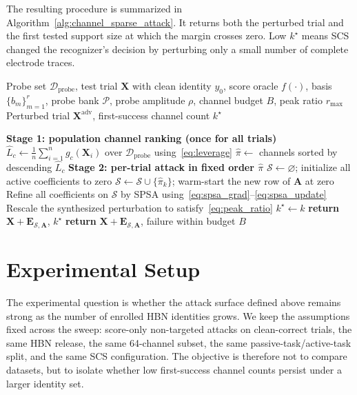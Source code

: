 \documentclass[journal]{IEEEtran}
\begin{document}
The resulting procedure is summarized in Algorithm~\ref{alg:channel_sparse_attack}. It returns both the perturbed trial and the first tested support size at which the margin crosses zero. Low $k^\star$ means SCS changed the recognizer's decision by perturbing only a small number of complete electrode traces.

\begin{algorithm}[t]
\caption{Sparse-Channel Search (SCS)}
\label{alg:channel_sparse_attack}
\begin{algorithmic}[1]
\REQUIRE Probe set $\mathcal{D}_{\mathrm{probe}}$, test trial $\mathbf{X}$ with clean identity $y_0$, score oracle $f(\cdot)$, basis $\{b_m\}_{m=1}^{r}$, probe bank $\mathcal{P}$, probe amplitude $\rho$, channel budget $B$, peak ratio $r_{\max}$
\ENSURE Perturbed trial $\mathbf{X}^{\mathrm{adv}}$, first-success channel count $k^\star$

\STATE \textbf{Stage 1: population channel ranking (once for all trials)}
    \STATE $\widehat{L}_c\leftarrow\frac{1}{n}\sum_{i=1}^{n} g_c(\mathbf{X}_i)$ over $\mathcal{D}_{\mathrm{probe}}$ using~\eqref{eq:leverage}
\ENDFOR
\STATE $\widehat{\pi}\leftarrow$ channels sorted by descending $\widehat{L}_c$
\STATE \textbf{Stage 2: per-trial attack in fixed order $\widehat{\pi}$}
\STATE $\mathcal{S}\leftarrow\varnothing$; initialize all active coefficients to zero
    \STATE $\mathcal{S}\leftarrow\mathcal{S}\cup\{\widehat{\pi}_k\}$; warm-start the new row of $\mathbf{A}$ at zero
    \STATE Refine all coefficients on $\mathcal{S}$ by SPSA using~\eqref{eq:spsa_grad}--\eqref{eq:spsa_update}
    \STATE Rescale the synthesized perturbation to satisfy~\eqref{eq:peak_ratio}
        \STATE $k^\star\leftarrow k$
        \STATE \textbf{return} $\mathbf{X}+\mathbf{E}_{\mathcal{S},\mathbf{A}}$, $k^\star$
    \ENDIF
\ENDFOR
\STATE \textbf{return} $\mathbf{X}+\mathbf{E}_{\mathcal{S},\mathbf{A}}$, failure within budget $B$
\end{algorithmic}
\end{algorithm}

\section{Experimental Setup}

The experimental question is whether the attack surface defined above remains strong as the number of enrolled HBN identities grows. We keep the assumptions fixed across the sweep: score-only non-targeted attacks on clean-correct trials, the same HBN release, the same 64-channel subset, the same passive-task/active-task split, and the same SCS configuration. The objective is therefore not to compare datasets, but to isolate whether low first-success channel counts persist under a larger identity set.
\end{document}
